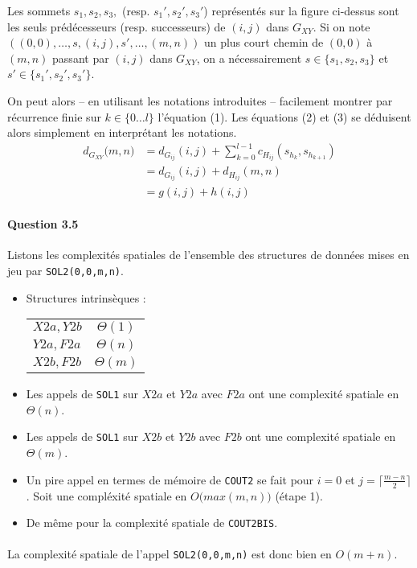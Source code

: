 Les sommets $s_1,s_2,s_3,$ (resp. $s_1',s_2',s_3'$) repr\'esent\'es
sur la figure ci-dessus sont les seuls pr\'ed\'ecesseurs
(resp. successeurs) de $(i,j)$ dans $G_{XY}$. Si on note
$((0,0),\ldots,s,(i,j),s',\ldots,(m,n))$ un plus court chemin de
$(0,0)$ \`a $(m,n)$ passant par $(i,j)$ dans $G_{XY}$, on a
n\'ecessairement $s\in\{s_1,s_2,s_3\}$ et $s'\in\{s_1',s_2',s_3'\}$.

On peut alors -- en utilisant les notations introduites -- facilement
montrer par r\'ecurrence finie sur $k\in\{0\ldots l\}$ l'\'equation
(1). Les \'equations (2) et (3) se d\'eduisent alors simplement en
interpr\'etant les notations.
\begin{align}
  d_{G_{XY}}\big(m,n\big)
  &=d_{G_{ij}}(i,j)+\sum_{k=0}^{l-1}c_{H_{ij}}(s_{h_k},s_{h_{k+1}})\\
  &=d_{G_{ij}}(i,j)+d_{H_{ij}}(m,n)\\
  &=g(i,j)+h(i,j)
\end{align}

\paragraph{Question 3.5}
Listons les complexit\'es spatiales de l'ensemble des structures de
donn\'ees mises en jeu par \verb'SOL2(0,0,m,n)'.
\begin{itemize}
\item Structures intrins\`eques :
\begin{table*}[h]
  \centering
\begin{tabular}{l|c}
  $X2a,Y2b$&$\Theta(1)$\\
  $Y2a,F2a$&$\Theta(n)$\\
  $X2b,F2b$&$\Theta(m)$\\
\end{tabular}
\end{table*}
\item Les appels de \verb'SOL1' sur $X2a$ et $Y2a$ avec $F2a$ ont une
  complexit\'e spatiale en $\Theta(n)$.
\item Les appels de \verb'SOL1' sur $X2b$ et $Y2b$ avec $F2b$ ont une
  complexit\'e spatiale en $\Theta(m)$.
\item Un pire appel en termes de m\'emoire de \verb'COUT2' se fait
  pour $i=0$ et $j=\lceil\frac{m-n}{2}\rceil$. Soit une compl\'exit\'e
  spatiale en $O\big(max(m,n)\big)$ (\'etape 1).
\item De m\^eme pour la complexit\'e spatiale de \verb'COUT2BIS'.
\end{itemize}
\paragraph{}
La complexit\'e spatiale de l'appel \verb'SOL2(0,0,m,n)' est donc bien
en $O(m+n)$.
